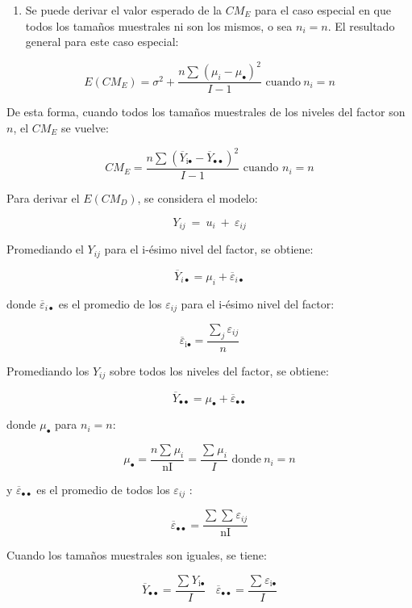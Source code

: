 \documentclass[]{book}
\providecommand{\tightlist}{%
  \setlength{\itemsep}{0pt}\setlength{\parskip}{0pt}}
\theoremstyle{definition}
\theoremstyle{definition}
\theoremstyle{definition}
\theoremstyle{remark}
\begin{document}
\begin{enumerate}
\def\labelenumi{\arabic{enumi}.}
\setcounter{enumi}{1}
\tightlist
\item
  Se puede derivar el valor esperado de la \(CM_E\) para el caso
  especial en que todos los tamaños muestrales ni son los mismos, o sea
  \(n_i = n\). El resultado general para este caso especial:
\end{enumerate}

\[
E\left( CM_E \right) = \sigma^{2} + \frac{n\sum_{}^{}\left( \mu_{i} - \mu_{\bullet} \right)^{2}}{I - 1}\text{ cuando}\ n_{i} = n
\]

De esta forma, cuando todos los tamaños muestrales de los niveles del
factor son \(n\), el \(CM_E\) se vuelve:

\[
CM_E = \frac{n\sum_{}^{}\left( {\overline{Y}}_{\text{i}\bullet} -
{\overline{Y}}_{\bullet\bullet} \right)^{2}}{I - 1}\text{ cuando }n_{i} = n
\]

Para derivar el \(E(CM_D)\), se considera el modelo:

\[
Y_{ij}\  = \ u_{i}\  + \ \varepsilon_{ij}
\]

Promediando el \(Y_{ij}\) para el i-ésimo nivel del factor, se obtiene:

\[
{\overline{Y}}_{i \bullet} = \mu_{i} + {\overline{\varepsilon}}_{i \bullet}
\]

donde \({\overline{\varepsilon}}_{i \bullet}\) es el promedio de los
\(\varepsilon_{ij}\) para el i-ésimo nivel del factor:

\[
{\overline{\varepsilon}}_{\text{i}\bullet} = \frac{\sum_{j}^{}\varepsilon_{ij}}{n}
\]

Promediando los \(Y_{ij}\) sobre todos los niveles del factor, se
obtiene:

\[
{\overline{Y}}_{\bullet\bullet} = \mu_\bullet + {\overline{\varepsilon}}_{\bullet \bullet}
\]

donde \(\mu_{\bullet}\) para \(n_{i} = n\):

\[
\mu_{\bullet} = \frac{n\sum_{}^{}\mu_{i}}{\text{nI}} = \frac{\sum_{}^{}\mu_{i}}{I}\text{ donde}\ n_{i} = n
\]

y \({\overline{\varepsilon}}_{\bullet\bullet}\) es el promedio de todos
los \(\varepsilon_{ij}\) :

\[
{\overline{\varepsilon}}_{\bullet\bullet} = \frac{\sum_{}^{}{\sum_{}^{}\varepsilon_{ij}}}{\text{nI}}
\]

Cuando los tamaños muestrales son iguales, se tiene:

\[
{\overline{Y}}_{\bullet \bullet} = \frac{\sum_{}^{}Y_{\text{i}\bullet}}{I}\ \ \ \ {\overline{\varepsilon}}_{\bullet \bullet} = \frac{\sum_{}^{}\varepsilon_{\text{i}\bullet}}{I}
\]
\end{document}
